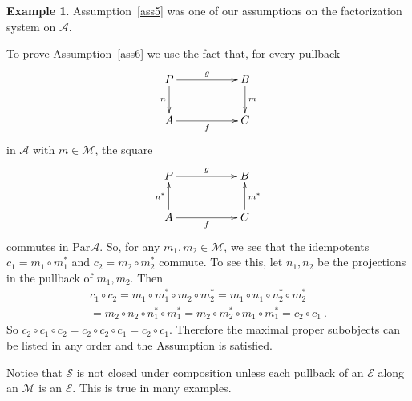 \documentclass[a4paper,12pt,reqno]{amsart}
\theoremstyle{definition}
\newtheorem{example}[theorem]{Example}
\theoremstyle{fact}
\theoremstyle{genquest}
\theoremstyle{step}
\def\CA{{\mathscr A}}
\def\CE{{\mathscr E}}
\def\CM{{\mathscr M}}
\def\CS{{\mathscr S}}
\begin{document}
\begin{example}
Assumption~\ref{ass5} was one of our assumptions on the factorization system on $\CA$. 

To prove Assumption~\ref{ass6} we use the fact that, for every pullback
\begin{equation}\label{pbm}
\xymatrix{
P \ar[rr]^-{g} \ar[d]_-{n} && B \ar[d]^-{m} \\
A \ar[rr]_-{f} && C}
\end{equation}
in $\CA$ with $m\in \CM$, the square
\begin{equation}
\xymatrix{
P \ar[rr]^-{g}  && B  \\
A \ar[rr]_-{f} \ar[u]^-{n^*} && C \ar[u]_-{m^*}}
\end{equation}
commutes in $\mathrm{Par}\CA$. So, for any $m_1,m_2\in \CM$, we see that
the idempotents $c_1=m_1\circ m_1^*$ and $c_2=m_2\circ m_2^*$ commute.
To see this, let $n_1,n_2$ be the projections in the pullback of $m_1,m_2$. Then
\begin{eqnarray*}
c_1\circ c_2 = m_1\circ m_1^*\circ m_2\circ m_2^* = m_1\circ n_1\circ n_2^*\circ m_2^* \\
= m_2\circ n_2\circ n_1^*\circ m_1^*= m_2\circ m_2^*\circ m_1\circ m_1^*=c_2\circ c_1 \ .
\end{eqnarray*}
So $c_2\circ c_1\circ c_2 = c_2\circ c_2\circ c_1 = c_2\circ c_1$.
Therefore the maximal proper subobjects can be listed in any order 
and the Assumption is satisfied.

Notice that $\CS$ is not closed under composition unless each pullback of an $\CE$
along an $\CM$ is an $\CE$. This is true in many examples. 
\end{example}
\end{document}
